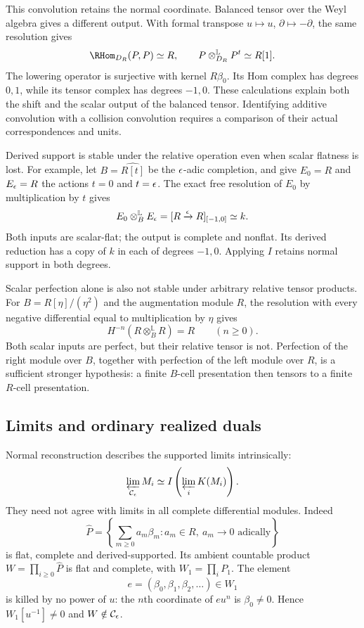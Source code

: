 This convolution retains the normal coordinate. Balanced tensor over
the Weyl algebra gives a different output. With formal transpose
$u\mapsto u$, $\partial\mapsto-\partial$, the same resolution gives
\[
 \RHom_{D_R}(P,P)\simeq R,\qquad
 P\otimes_{D_R}^{\mathbb L}P^t\simeq R[1].
\]
The lowering operator is surjective with kernel $R\beta_0$.
Its Hom complex has degrees $0,1$, while its tensor complex has
degrees $-1,0$. These calculations explain both the shift and the
scalar output of the balanced tensor. Identifying additive convolution
with a collision convolution requires a comparison of their actual
correspondences and units.

Derived support is stable under the relative operation even when
scalar flatness is lost. For example, let $B=\widehat{R[t]}$ be
the $\epsilon$-adic completion, and give $E_0=R$ and $E_\epsilon=R$
the actions $t=0$ and $t=\epsilon$. The exact free resolution of
$E_0$ by multiplication by $t$ gives
\[
 E_0\otimes_B^{\mathbb L}E_\epsilon
       =[R\xrightarrow{\epsilon}R]_{[-1,0]}\simeq k.
\]
Both inputs are scalar-flat; the output is complete and nonflat.
Its derived reduction has a copy of $k$ in each of degrees $-1,0$.
Applying $I$ retains normal support in both degrees.

Scalar perfection alone is also not stable under arbitrary relative
tensor products. For $B=R[\eta]/(\eta^2)$ and the augmentation
module $R$, the resolution with every negative differential equal
to multiplication by $\eta$ gives
\[
 H^{-n}(R\otimes_B^{\mathbb L}R)=R\qquad(n\geq0).
\]
Both scalar inputs are perfect, but their relative tensor is not.
Perfection of the right module over $B$, together with perfection
of the left module over $R$, is a sufficient stronger hypothesis:
a finite $B$-cell presentation then tensors to a finite $R$-cell
presentation.

\subsection{Limits and ordinary realized duals}

Normal reconstruction describes the supported limits intrinsically:
\[
 \varprojlim_{\mathcal C_\epsilon}M_i
       \simeq I\left(\varprojlim_iK(M_i)\right).
\]
They need not agree with limits in all complete differential modules.
Indeed
\[
 \widehat P=\left\{\sum_{m\geq0}a_m\beta_m:
       a_m\in R,\ a_m\longrightarrow0\text{ adically}\right\}
\]
is flat, complete and derived-supported. Its ambient countable product
$W=\prod_{i\geq0}\widehat P$ is flat and complete, with
$W_1=\prod_iP_1$. The element
\begin{equation}\label{cyjets:eq:diagonal-product}
 e=(\beta_0,\beta_1,\beta_2,\ldots)\in W_1
\end{equation}
is killed by no power of $u$: the $n$th coordinate of $eu^n$
is $\beta_0\ne0$. Hence $W_1[u^{-1}]\ne0$ and
$W\notin\mathcal C_\epsilon$.

